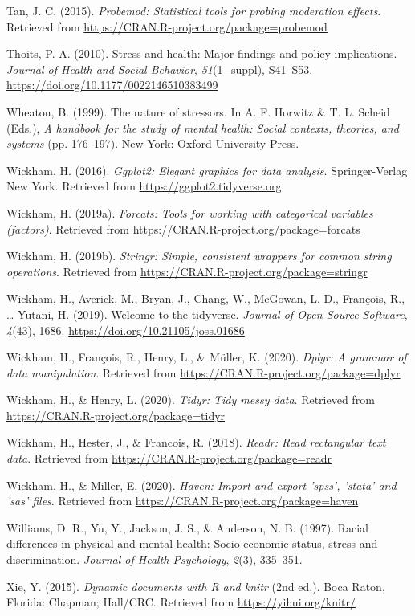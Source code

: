\documentclass[
  english,
  man,floatsintext]{apa6}
\begin{document}
\leavevmode\hypertarget{ref-R-probemod}{}%
Tan, J. C. (2015). \emph{Probemod: Statistical tools for probing moderation effects}. Retrieved from \url{https://CRAN.R-project.org/package=probemod}

\leavevmode\hypertarget{ref-thotis2010}{}%
Thoits, P. A. (2010). Stress and health: Major findings and policy implications. \emph{Journal of Health and Social Behavior}, \emph{51}(1\_suppl), S41--S53. \url{https://doi.org/10.1177/0022146510383499}

\leavevmode\hypertarget{ref-wheaton1999}{}%
Wheaton, B. (1999). The nature of stressors. In A. F. Horwitz \& T. L. Scheid (Eds.), \emph{A handbook for the study of mental health: Social contexts, theories, and systems} (pp. 176--197). New York: Oxford University Press.

\leavevmode\hypertarget{ref-R-ggplot2}{}%
Wickham, H. (2016). \emph{Ggplot2: Elegant graphics for data analysis}. Springer-Verlag New York. Retrieved from \url{https://ggplot2.tidyverse.org}

\leavevmode\hypertarget{ref-R-forcats}{}%
Wickham, H. (2019a). \emph{Forcats: Tools for working with categorical variables (factors)}. Retrieved from \url{https://CRAN.R-project.org/package=forcats}

\leavevmode\hypertarget{ref-R-stringr}{}%
Wickham, H. (2019b). \emph{Stringr: Simple, consistent wrappers for common string operations}. Retrieved from \url{https://CRAN.R-project.org/package=stringr}

\leavevmode\hypertarget{ref-R-tidyverse}{}%
Wickham, H., Averick, M., Bryan, J., Chang, W., McGowan, L. D., François, R., \ldots{} Yutani, H. (2019). Welcome to the tidyverse. \emph{Journal of Open Source Software}, \emph{4}(43), 1686. \url{https://doi.org/10.21105/joss.01686}

\leavevmode\hypertarget{ref-R-dplyr}{}%
Wickham, H., François, R., Henry, L., \& Müller, K. (2020). \emph{Dplyr: A grammar of data manipulation}. Retrieved from \url{https://CRAN.R-project.org/package=dplyr}

\leavevmode\hypertarget{ref-R-tidyr}{}%
Wickham, H., \& Henry, L. (2020). \emph{Tidyr: Tidy messy data}. Retrieved from \url{https://CRAN.R-project.org/package=tidyr}

\leavevmode\hypertarget{ref-R-readr}{}%
Wickham, H., Hester, J., \& Francois, R. (2018). \emph{Readr: Read rectangular text data}. Retrieved from \url{https://CRAN.R-project.org/package=readr}

\leavevmode\hypertarget{ref-R-haven}{}%
Wickham, H., \& Miller, E. (2020). \emph{Haven: Import and export 'spss', 'stata' and 'sas' files}. Retrieved from \url{https://CRAN.R-project.org/package=haven}

\leavevmode\hypertarget{ref-williams1997}{}%
Williams, D. R., Yu, Y., Jackson, J. S., \& Anderson, N. B. (1997). Racial differences in physical and mental health: Socio-economic status, stress and discrimination. \emph{Journal of Health Psychology}, \emph{2}(3), 335--351.

\leavevmode\hypertarget{ref-R-knitr}{}%
Xie, Y. (2015). \emph{Dynamic documents with R and knitr} (2nd ed.). Boca Raton, Florida: Chapman; Hall/CRC. Retrieved from \url{https://yihui.org/knitr/}

\endgroup
\end{document}
